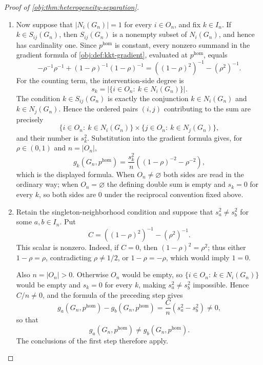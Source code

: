 \documentclass[11pt]{article}
\begin{document}
\begin{proof}[Proof of \cref{obj:thm:heterogeneity-separation}]
\begin{enumerate}
\item Now suppose that \(|N_i(G_n)|=1\) for every \(i\in O_n\), and fix \(k\in I_n\).  If \(k\in S_{ij}(G_n)\), then \(S_{ij}(G_n)\) is a nonempty subset of \(N_i(G_n)\), and hence has cardinality one.  Since \(p^{\mathrm{hom}}\) is constant, every nonzero summand in the gradient formula of \cref{obj:def:kkt-gradient}, evaluated at \(p^{\mathrm{hom}}\), equals
\[
-\rho^{-1}\rho^{-1}+(1-\rho)^{-1}(1-\rho)^{-1}
=((1-\rho)^2)^{-1}-(\rho^2)^{-1}.
\]
For the counting term, the intervention-side degree is
\[
s_k=\left|\{i\in O_n:\ k\in N_i(G_n)\}\right|.
\]
The condition \(k\in S_{ij}(G_n)\) is exactly the conjunction \(k\in N_i(G_n)\) and \(k\in N_j(G_n)\).  Hence the ordered pairs \((i,j)\) contributing to the sum are precisely
\[
\{i\in O_n:\ k\in N_i(G_n)\}\times
\{j\in O_n:\ k\in N_j(G_n)\},
\]
and their number is \(s_k^2\).  Substitution into the gradient formula gives, for \(\rho\in(0,1)\) and \(n=\lvert O_n\rvert\),
\[
g_k(G_n,p^{\mathrm{hom}})
=
\frac{s_k^2}{n}\left((1-\rho)^{-2}-\rho^{-2}\right),
\]
which is the displayed formula.  When \(O_n\neq\varnothing\) both sides are read in the ordinary way; when \(O_n=\varnothing\) the defining double sum is empty and \(s_k=0\) for every \(k\), so both sides are \(0\) under the reciprocal convention fixed above.

\item Retain the singleton-neighborhood condition and suppose that
\(s_a^2\neq s_b^2\) for some \(a,b\in I_n\).  Put
\[
C=((1-\rho)^2)^{-1}-(\rho^2)^{-1}.
\]
This scalar is nonzero.  Indeed, if \(C=0\), then
\((1-\rho)^2=\rho^2\); thus either \(1-\rho=\rho\), contradicting
\(\rho\neq1/2\), or \(1-\rho=-\rho\), which would imply \(1=0\).

Also \(n=\lvert O_n\rvert>0\).  Otherwise \(O_n\) would be empty, so \(\{i\in O_n:\ k\in N_i(G_n)\}\) would be empty and \(s_k=0\) for every \(k\), making \(s_a^2\neq s_b^2\) impossible.  Hence \(C/n\neq0\), and the formula of the preceding step gives
\[
g_a(G_n,p^{\mathrm{hom}})-g_b(G_n,p^{\mathrm{hom}})
=\frac{C}{n}\left(s_a^2-s_b^2\right)\neq0,
\]
so that
\[
g_a(G_n,p^{\mathrm{hom}})\neq g_b(G_n,p^{\mathrm{hom}}).
\]
The conclusions of the first step therefore apply.
\end{enumerate}
\end{proof}
\end{document}
